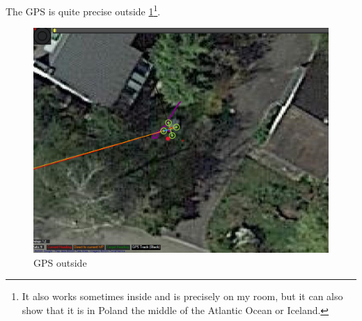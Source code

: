\documentclass[svgnames]{article}
\begin{document}
	The GPS is quite precise outside \cref{fig:gpsoutside}\footnote{It also works sometimes inside and is precisely on my room, but it can also show that it is in Poland the middle of the Atlantic Ocean or Iceland.}.
	
\begin{figure}[ht]
	\centering
	\includegraphics[scale=0.2]{pictures/GPS_Outsidewithdot}
	\caption{\gls{GPS} outside}
	\label{fig:gpsoutside}
\end{figure}
	
	

	 
\end{document}
